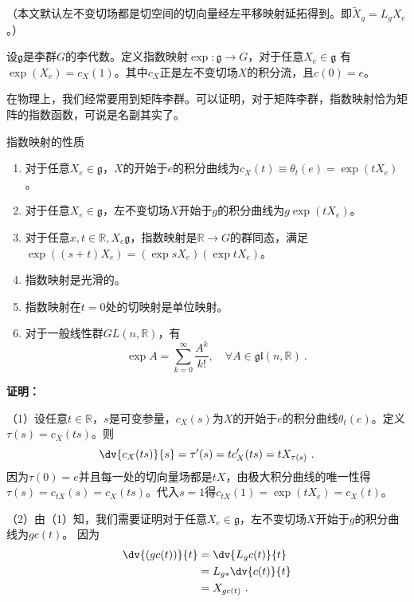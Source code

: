 
（本文默认左不变切场都是切空间的切向量经左平移映射延拓得到。即$\widetilde X_g=L_g X_e$。）
\begin{definition}{}
设$\mathfrak g$是李群$G$的李代数。定义指数映射$\exp :\mathfrak g\to G$，对于任意$X_e\in \mathfrak g$ 有$\exp (X_e)=c_X(1)$。其中$c_X$正是左不变切场$X$的积分流，且$c(0)=e$。
\end{definition}
在物理上，我们经常要用到矩阵李群。可以证明，对于矩阵李群，指数映射恰为矩阵的指数函数，可说是名副其实了。

\begin{theorem}{指数映射的性质}
\begin{enumerate}
\item 对于任意$X_e\in \mathfrak g$，$X$的开始于$e$的积分曲线为$c_X(t)\equiv\theta_t(e)=\exp (tX_e)$。
\item 对于任意$X_e\in \mathfrak g$，左不变切场$X$开始于$g$的积分曲线为$g\exp (tX_e)$。
\item 对于任意$x,t\in\mathbb R,X_e\mathfrak g$，指数映射是$\mathbb R\to G$的群同态，满足$\exp ((s+t)X_e)=(\exp sX_e)(\exp tX_e)$。

\item 指数映射是光滑的。
\item 指数映射在$t=0$处的切映射是单位映射。
\item 对于一般线性群$GL(n,\mathbb R)$，有
\begin{equation}
\exp  A=\sum_{k=0}^\infty\frac{A^k}{k!},\quad \forall A\in\mathfrak{gl}(n,\mathbb{R})~.
\end{equation}
\end{enumerate}
\end{theorem}

\textbf{证明：}

（1）设任意$t\in \mathbb R$，$s$是可变参量，$c_X(s)$为$X$的开始于$e$的积分曲线$\theta_t(e)$。定义$\tau(s)=c_X(ts)$。则
\begin{equation}
\dv{c_X(ts)}{s}=\tau'(s)=tc'_X(ts)=tX_{\tau (s)}~.
\end{equation}
因为$\tau(0)=e$并且每一处的切向量场都是$tX$，由极大积分曲线的唯一性得$\tau(s)=c_{tX}(s)=c_X(ts)$。代入$s=1$得$c_{tX}(1)=\exp(tX_e)=c_X(t)$。

（2）由（1）知，我们需要证明对于任意$X_e\in \mathfrak g$，左不变切场$X$开始于$g$的积分曲线为$gc(t)$。
因为
\begin{equation}
\begin{aligned}
\dv{(gc(t))}{t}&=\dv{L_gc(t)}{t}\\
&=L_{g*}\dv{c(t)}{t}\\
&=X_{gc(t)}~.
\end{aligned}
\end{equation}

